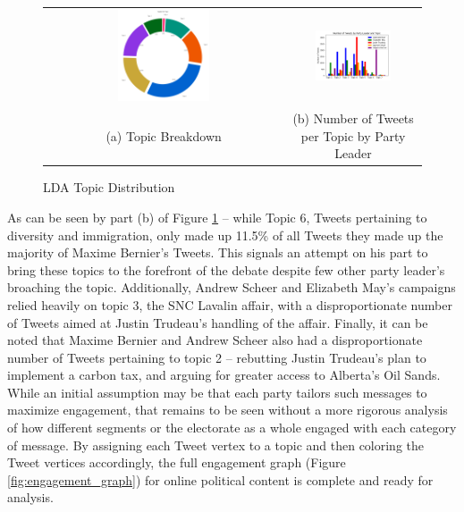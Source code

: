 \begin{figure}[h!]
  \centering
  \begin{tabular}{cc}
    \includegraphics[width=0.40\textwidth]{Figures/topic_distribution} &
    \includegraphics[width=0.60\textwidth]{Figures/grouped_bar_by_pl_topic} \\
  (a) Topic Breakdown & (b) Number of Tweets per Topic by Party Leader \\[6pt]
  \end{tabular}
  \caption[LDA Topic Distribution]{LDA Topic Distribution}
  \label{fig:topic_distribution}
\end{figure}

As can be seen by part (b) of Figure \ref{fig:topic_distribution} -- while Topic
6, Tweets pertaining to diversity and immigration, only made up 11.5\% of all
Tweets they made up the majority of Maxime Bernier's Tweets. This signals an
attempt on his part to bring these topics to the forefront of the debate despite
few other party leader's broaching the topic. Additionally, Andrew Scheer and
Elizabeth May's campaigns relied heavily on topic 3, the SNC Lavalin affair,
with a disproportionate number of Tweets aimed at Justin Trudeau's handling of
the affair. Finally, it can be noted that Maxime Bernier and Andrew Scheer also
had a disproportionate number of Tweets pertaining to topic 2 -- rebutting
Justin Trudeau's plan to implement a carbon tax, and arguing for greater access
to Alberta's Oil Sands. While an initial assumption may be that each party
tailors such messages to maximize engagement, that remains to be seen without a
more rigorous analysis of how different segments or the electorate as a whole
engaged with each category of message. By assigning each Tweet vertex to a topic
and then coloring the Tweet vertices accordingly, the full engagement graph
(Figure \ref{fig:engagement_graph}) for online political content is complete and
ready for analysis. 


